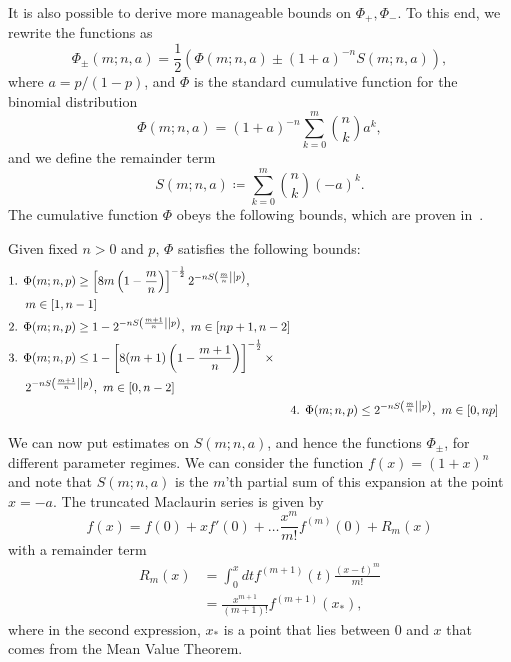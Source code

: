 \documentclass[pra,
aps,
twocolumn,
superscriptaddress,
groupedaddress,
nofootinbib,
reprint
]{revtex4-1}
\begin{document}
It is also possible to derive more manageable bounds on $\Phi_+, \Phi_-$.
To this end, we rewrite the functions as
\begin{equation}
	\Phi_{\pm}(m; n, a) = \frac{1}{2}(\Phi(m; n, a) \pm (1+a)^{-n} S(m; n, a)),
\end{equation}
where $a = p/(1-p)$, and $\Phi$ is the standard cumulative function for the binomial distribution
\begin{equation}
	\Phi(m; n, a) = (1+a)^{-n} \sum_{k=0}^m \binom{n}{k} a^k,
\end{equation}
and we define the remainder term
\begin{equation}
	S(m; n, a) \coloneqq \sum_{k=0}^m \binom{n}{k} (-a)^k.
\end{equation}
The cumulative function $\Phi$ obeys the following bounds, which are proven in~\cite{cit:ash}.
\begin{proposition}\label{phi_bounds}
	Given fixed $n>0$ and $p$, $\Phi$ satisfies the following bounds:
	\begin{align*}
		\begin{split}
		&\text{1. } \Phi(m; n, p) \geq \left[ 8m\left(1-\frac{m}{n}\right) \right]^{-\frac{1}{2}} 2^{-n\ent{\frac{m}{n}}{p}}, \\
		&\hspace{14pt} m\in [1,n-1] \\
		&\text{2. } \Phi(m; n, p) \geq 1 - 2^{-n\ent{\frac{m+1}{n}}{p}},\ m\in [np+1,n-2] \\
		&\text{3. } \Phi(m; n, p) \leq 1 - \left[ 8(m+1)\left(1-\frac{m+1}{n}\right) \right]^{-\frac{1}{2}}\times \\
		&\hspace{14pt} 2^{-n\ent{\frac{m+1}{n}}{p}},\ m\in [0,n-2]
		\end{split}
		\\
		&\text{4. } \Phi(m; n, p) \leq 2^{-n\ent{\frac{m}{n}}{p}},\ m\in [0,np]
	\end{align*}
\end{proposition}

We can now put estimates on $S(m; n, a)$, and hence the functions $\Phi_{\pm}$, for different parameter regimes. 
We can consider the function $f(x) = (1+x)^n$ and note that $S(m; n, a)$ is the $m$'th partial sum of this expansion at the point $x=-a$. The truncated Maclaurin series is given by
\begin{equation}
	f(x) = f(0) + x f'(0) + \dots \frac{x^m}{m!}f^{(m)}(0) + R_m(x)
\end{equation}
with a remainder term
\begin{align}
	R_m (x)&= \int_{0}^x dt f^{(m+1)}(t) \frac{(x-t)^m}{m!} \\
	&= \frac{x^{m+1}}{(m+1)!} f^{(m+1)}(x_*),
\end{align}
where in the second expression, $x_*$ is a point that lies between $0$ and $x$ that comes from the Mean Value Theorem.
\end{document}

